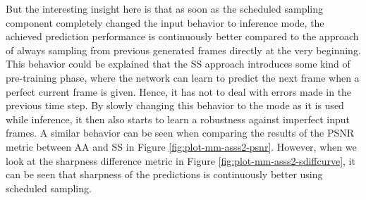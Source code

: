 But the interesting insight here is that as soon as the scheduled sampling component completely changed the input behavior to inference mode, the achieved prediction performance is continuously better compared to the approach of always sampling from previous generated frames directly at the very beginning. This behavior could be explained that the SS approach introduces some kind of pre-training phase, where the network can learn to predict the next frame when a perfect current frame is given. Hence, it has not to deal with errors made in the previous time step. By slowly changing this behavior to the mode as it is used while inference, it then also starts to learn a robustness against imperfect input frames. A similar behavior can be seen when comparing the results of the PSNR metric between AA and SS in Figure \ref{fig:plot-mm-asss2-psnr}. However, when we look at the sharpness difference metric in Figure \ref{fig:plot-mm-asss2-sdiffcurve}, it can be seen that sharpness of the predictions is continuously better using scheduled sampling.

